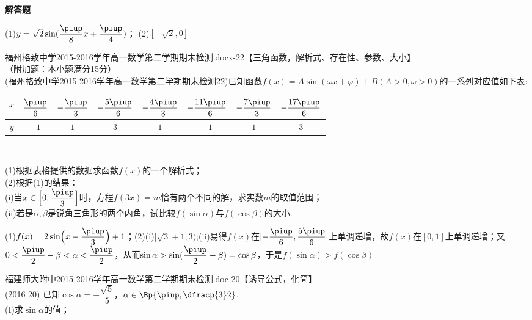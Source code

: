 \begin{exercise}{\bf 解答题}
\begin{answer}
        (1)$y=\sqrt{2}\sin(\dfrac{\piup}8x+\dfrac{\piup}4)$；
        (2)$[-\sqrt{2},0]$
      \end{answer}
    \item 福州格致中学2015-2016学年高一数学第二学期期末检测.docx-22【三角函数，解析式、存在性、参数、大小】\\
      （附加题：本小题满分15分）\\
      (福州格致中学2015-2016学年高一数学第二学期期末检测22)已知函数$f(x)=A\sin(\omega x+\varphi)+B (A>0,\omega>0)$的一系列对应值如下表:
      \begin{center}
        \renewcommand{\arraystretch}{1.4}
        \begin{tabular}{|*{8}{c|}}
          \hline
            $x$
            &$\dfrac{\piup}6$
            &$-\dfrac{\piup}3$
            &$-\dfrac{5\piup}6$
            &$-\dfrac{4\piup}3$
            &$-\dfrac{11\piup}6$
            &$-\dfrac{7\piup}3$
            &$-\dfrac{17\piup}6$\\
          \hline
            $y$
            &$-1$
            &$1$
            &$3$
            &$1$
            &$-1$
            &$1$
            &$3$\\
          \hline
        \end{tabular}\\
      \end{center}
      (1)根据表格提供的数据求函数$f(x)$的一个解析式；\\
      (2)根据(1)的结果：\\
      \;(i)当$x\in\Bigl[0,\dfrac{\piup}3\Bigr]$时，方程$f(3x)=m$恰有两个不同的解，求实数$m$的取值范围；\\
      \;(ii)若是$\alpha,\beta$是锐角三角形的两个内角，试比较$f(\sin \alpha)$与$f(\cos \beta)$的大小.
      \begin{answer}
        (1)$f(x)=2\sin\Bigl(x-\dfrac{\piup}3\Bigr)+1$；(2)(i)$[\sqrt{3}+1,3)$;(ii)易得$f(x)$在$[-\dfrac{\piup}6,\dfrac{5\piup}6]$上单调递增，故$f(x)$在$[0,1]$上单调递增；又$0<\dfrac{\piup}2-\beta<\alpha<\dfrac{\piup}2$，从而$\sin\alpha>\sin(\dfrac{\piup}2-\beta)=\cos\beta$，于是$f(\sin \alpha)>f(\cos \beta)$
      \end{answer}
    \item 福建师大附中2015-2016学年高一数学第二学期期末检测.doc-20【诱导公式，化简】\\
      (2016  20)
      已知$\cos\alpha=-\dfrac{\sqrt5}5$，$\alpha\in\Bp{\piup,\dfracp{3}2}$.\\
      (I)求$\sin\alpha$的值；

\end{exercise}
